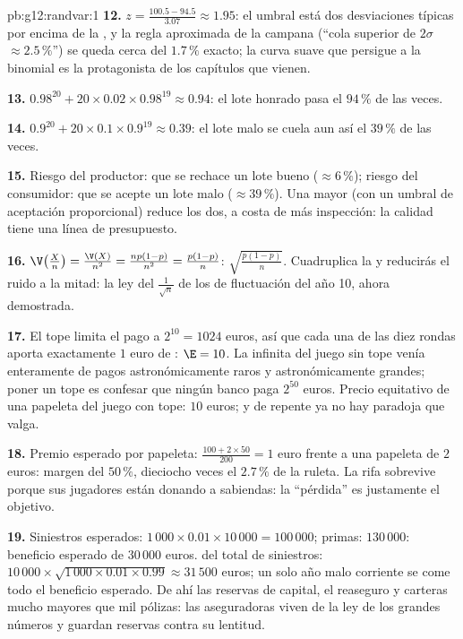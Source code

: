 \begin{solution}{pb:g12:randvar:1}
\textbf{12.} $z = \frac{100.5 - 94.5}{3.07} \approx 1.95$: el umbral está
dos desviaciones típicas por encima de la , y la regla aproximada de
la campana (``cola superior de $2\sigma$ $\approx 2.5\,\%$'') se queda
cerca del $1.7\,\%$ exacto; la curva suave que persigue a la binomial es
la protagonista de los capítulos que vienen.

\textbf{13.} $0.98^{20} + 20 \times 0.02 \times 0.98^{19} \approx 0.94$: el
lote honrado pasa el $94\,\%$ de las veces.

\textbf{14.} $0.9^{20} + 20 \times 0.1 \times 0.9^{19} \approx 0.39$: el
lote malo se cuela aun así el $39\,\%$ de las veces.

\textbf{15.} Riesgo del productor: que se rechace un lote bueno
($\approx 6\,\%$); riesgo del consumidor: que se acepte un lote malo
($\approx 39\,\%$). Una  mayor (con un umbral de aceptación
proporcional) reduce los dos, a costa de más inspección: la calidad tiene
una línea de presupuesto.

\textbf{16.} $\V\!\left(\frac Xn\right) = \frac{\V(X)}{n^2} =
\frac{np(1-p)}{n^2} = \frac{p(1-p)}{n}$: 
$\sqrt{\frac{p(1-p)}{n}}$. Cuadruplica la  y reducirás el ruido a la
mitad: la ley del $\frac{1}{\sqrt n}$ de los  de fluctuación del
año 10, ahora demostrada.

\textbf{17.} El tope limita el pago a $2^{10} = 1024$ euros, así que cada
una de las diez rondas aporta exactamente $1$ euro de :
$\E = 10$. La  infinita del juego sin tope venía enteramente de
pagos astronómicamente raros y astronómicamente grandes; poner un tope es
confesar que ningún banco paga $2^{50}$ euros. Precio equitativo de una
papeleta del juego con tope: $10$ euros; y de repente ya no hay paradoja
que valga.

\textbf{18.} Premio esperado por papeleta:
$\frac{100 + 2 \times 50}{200} = 1$ euro frente a una papeleta de $2$
euros: margen del $50\,\%$, dieciocho veces el $2.7\,\%$ de la ruleta. La
rifa sobrevive porque sus jugadores están donando a sabiendas: la
``pérdida'' es justamente el objetivo.

\textbf{19.} Siniestros esperados:
$1\,000 \times 0.01 \times 10\,000 = 100\,000$; primas: $130\,000$:
beneficio esperado de $30\,000$ euros.  del total de
siniestros:
$10\,000 \times \sqrt{1\,000 \times 0.01 \times 0.99} \approx 31\,500$
euros; un solo año malo corriente se come todo el beneficio esperado. De
ahí las reservas de capital, el reaseguro y carteras mucho mayores que mil
pólizas: las aseguradoras viven de la ley de los grandes números y guardan
reservas contra su lentitud.


\end{solution}
